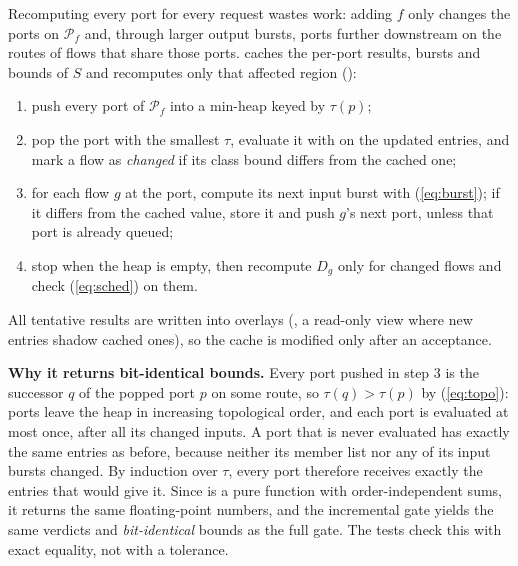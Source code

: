 \documentclass[9pt,a4paper,twocolumn,twoside]{tau-class/tau}
\newcommand{\src}[1]{../../src/tsn_gate/#1}
\providecommand{\eqref}[1]{(\ref{#1})}
\begin{document}
        Recomputing every port for every request wastes work: adding $f$ only changes the ports on $\mathcal{P}_f$ and, through larger output bursts, ports further downstream on the routes of flows that share those ports.  caches the per-port results, bursts and bounds of $S$ and recomputes only that affected region ():
        \begin{enumerate}
            \item push every port of $\mathcal{P}_f$ into a min-heap keyed by $\tau(p)$;
            \item pop the port with the smallest $\tau$, evaluate it with  on the updated entries, and mark a flow as \emph{changed} if its class bound differs from the cached one;
            \item for each flow $g$ at the port, compute its next input burst with \eqref{eq:burst}; if it differs from the cached value, store it and push $g$'s next port, unless that port is already queued;
            \item stop when the heap is empty, then recompute $D_g$ only for changed flows and check \eqref{eq:sched} on them.
        \end{enumerate}
        All tentative results are written into overlays (, a read-only view where new entries shadow cached ones), so the cache is modified only after an acceptance.

        \begin{code}
            }
            \caption{Affected-region recomputation of the incremental gate (\texttt{gate.py}).}
            \label{lst:incr}
        \end{code}

        \textbf{Why it returns bit-identical bounds.} Every port pushed in step 3 is the successor $q$ of the popped port $p$ on some route, so $\tau(q) > \tau(p)$ by \eqref{eq:topo}: ports leave the heap in increasing topological order, and each port is evaluated at most once, after all its changed inputs. A port that is never evaluated has exactly the same entries as before, because neither its member list nor any of its input bursts changed. By induction over $\tau$, every port therefore receives exactly the entries that  would give it. Since  is a pure function with order-independent sums, it returns the same floating-point numbers, and the incremental gate yields the same verdicts and \emph{bit-identical} bounds as the full gate. The tests check this with exact equality, not with a tolerance.
\end{document}
